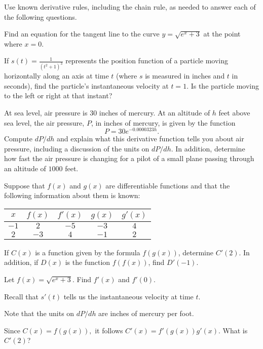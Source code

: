 \begin{activity} \label{A:2.5.3}   
Use known derivative rules, including the chain rule, as needed to answer each of the following questions.
\ba
	\item Find an equation for the tangent line to the curve $y= \sqrt{e^x + 3}$ at the point where $x=0$.

  	\item If $\displaystyle s(t) = \frac{1}{(t^2+1)^3}$ represents the position function of a particle moving horizontally along an axis at time $t$ (where $s$ is measured in inches and $t$ in seconds), find the particle's instantaneous velocity at $t=1$.  Is the particle moving to the left or right at that instant?

  	\item At sea level, air pressure is $30$ inches of mercury.  At an altitude of $h$ feet above sea level, the air pressure, $P$, in inches of mercury, is given by the function
$$P = 30 e^{-0.0000323 h}.$$
Compute $dP/dh$ and explain what this derivative function tells you about air pressure, including a discussion of the units on $dP/dh$.  In addition, determine how fast the air pressure is changing for a pilot of a small plane passing through an altitude of $1000$ feet.
  	
	\item Suppose that $f(x)$ and $g(x)$ are differentiable functions and that the following information about them is known:
	
\begin{center}
\begin{tabular}{ | c | c | c | c | c | }
   \hline 
   $x$ 	& $f(x)$  	& $f'(x)$	& $g(x)$	& $g'(x)$ \\  \hline

   $-1$ 	& $2$	& $-5$ & $-3$ &  $4$ \\ \hline

   $2$ 	& $-3$	& $4$ & $-1$ &  $2$ \\ \hline
\end{tabular}
\end{center}

If $C(x)$ is a function given by the formula $f(g(x))$, determine $C'(2)$.   In addition, if $D(x)$ is the function $f(f(x))$, find $D'(-1)$. 
\ea
\end{activity}
\begin{smallhint}
\ba
	\item Let $f(x) = \sqrt{e^x + 3}.$ Find $f'(x)$ and $f'(0)$.
  	\item Recall that $s'(t)$ tells us the instantaneous velocity at time $t$.
  	\item Note that the units on $dP/dh$ are inches of mercury per foot.
  	\item Since $C(x) = f(g(x)),$ it follows $C'(x) = f'(g(x))g'(x).$  What is $C'(2)$?
\ea
\end{smallhint}
